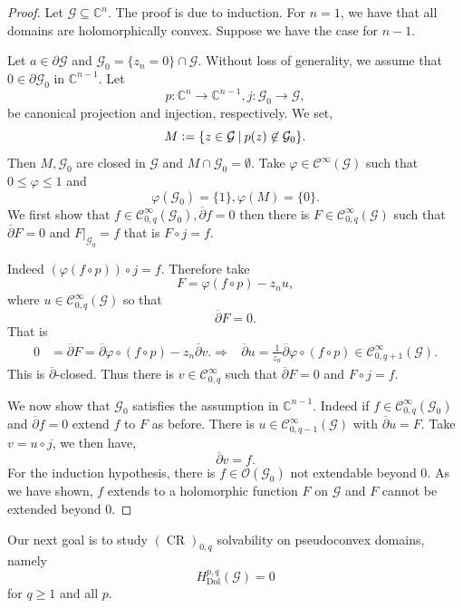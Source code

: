 \documentclass{article}
\DeclareMathOperator{\CR}{CR}
\DeclareMathOperator{\Dol}{Dol}
\newcommand{\defeq}{\vcentcolon=}
\newcommand{\C}[0]{\mathbb{C}}
\newcommand{\G}[0]{\mathcal{G}}
\newcommand{\sep}[0]{\:|\:}
\newcommand{\bd}[0]{\partial}
\newcommand{\Ouv}[0]{\mathcal{O}}
\newcommand{\ck}[1]{\mathcal{C}^{#1}}
\newcommand{\cinf}[0]{\ck{\infty}}
\begin{document}
\begin{proof}
  Let $\G\subseteq\C^n$. The proof is due to induction. For $n=1$, we have that all domains are holomorphically convex. Suppose we have the case for $n-1$.
  \par Let $a\in\bd\G$ and $\G_0 = \{z_n=0\}\cap\G$. Without loss of generality, we assume that $0\in\bd\G_0$ in $\C^{n-1}$. Let 
  \begin{equation*}
    p:\C^n\to\C^{n-1},j:\G_0\to\G,
  \end{equation*}
  be canonical projection and injection, respectively. We set,
  \begin{equation*}
    M\defeq \{z\in\G\sep p(z)\not\in\G_0\}.
  \end{equation*}
  Then $M,\G_0$ are closed in $\G$ and $M\cap \G_0 = \emptyset$. Take $\varphi\in\cinf(\G)$ such that $0\leq \varphi\leq 1$ and
  \begin{equation*}
    \varphi(\G_0) = \{1\}, \varphi(M) = \{0\}.
  \end{equation*}
  We first show that $f\in\cinf_{0,q}(\G_0), \overline{\bd} f = 0$ then there is $F\in\cinf_{0,q}(\G)$ such that $\overline{\bd}F=0$ and $F|_{\G_0} = f$ that is $F\circ j = f$.
  \par Indeed $(\varphi(f\circ p))\circ j=f$. Therefore take 
  \begin{equation*}
    F = \varphi(f\circ p) - z_nu,
  \end{equation*}
  where $u\in\cinf_{0,q}(\G)$ so that 
  \begin{equation*}
    \overline{\partial}F = 0.
  \end{equation*}
  That is 
  \begin{align*}
    0 & = \overline{\partial}F = \overline{\partial}\varphi\circ(f\circ p) - z_n\overline{\partial}v.
    \Rightarrow & \overline{\partial}u = {\frac 1 {z_n}}\overline{\partial}\varphi\circ(f\circ p)\in\cinf_{0,q+1}(\G).
  \end{align*}
  This is $\overline{\partial}$-closed. Thus there is $v\in\cinf_{0,q}$ such that $\overline{\partial}F=0$ and $F\circ j = f$.
  \par We now show that $\G_0$ satisfies the assumption in $\C^{n-1}$. Indeed if $f\in\cinf_{0,q}(\G_0)$ and $\overline{\partial}f=0$ extend $f$ to $F$ as before. There is $u\in\cinf_{0,q-1}(\G)$ with $\overline{\partial}u=F$. Take $v = u\circ j$, we then have,
  \begin{equation*}
    \overline{\partial}v = f.
  \end{equation*}
  For the induction hypothesis, there is $f\in\Ouv(\G_0)$ not extendable beyond $0$. As we have shown, $f$ extends to a holomorphic function $F$ on $\G$ and $F$ cannot be extended beyond $0$.
\end{proof}
Our next goal is to study $(\CR)_{0,q}$ solvability on pseudoconvex domains, namely 
\begin{equation*}
  H_{\Dol}^{p,q}(\G) = 0
\end{equation*}
for $q\geq 1$ and all $p$.
\end{document}
